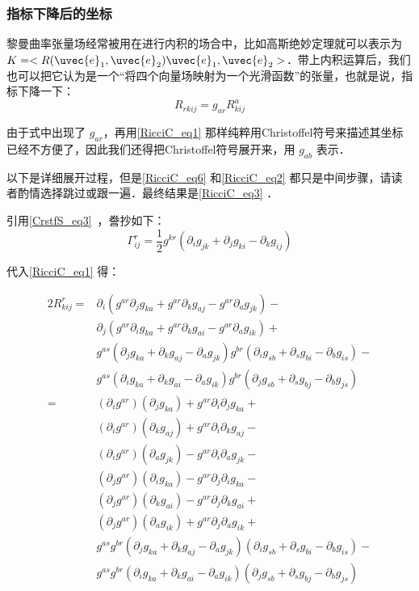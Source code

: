 \subsubsection{指标下降后的坐标}

黎曼曲率张量场经常被用在进行内积的场合中，比如高斯绝妙定理就可以表示为 $K=<R(\uvec{e}_1, \uvec{e}_2)\uvec{e}_1, \uvec{e}_2>$．带上内积运算后，我们也可以把它认为是一个“将四个向量场映射为一个光滑函数”的张量，也就是说，指标下降一下：
\begin{equation}
R_{rkij}=g_{ar}R^a_{kij}
\end{equation}

由于式中出现了 $g_{ar}$，再用\autoref{RicciC_eq1} 那样纯粹用Christoffel符号来描述其坐标已经不方便了，因此我们还得把Christoffel符号展开来，用 $g_{ab}$ 表示．

以下是详细展开过程，但是\autoref{RicciC_eq6} 和\autoref{RicciC_eq2} 都只是中间步骤，请读者酌情选择跳过或跟一遍．最终结果是\autoref{RicciC_eq3} ．

引用\autoref{CrstfS_eq3}~，誊抄如下：
\begin{equation}
\Gamma^{r}_{ij}=\frac{1}{2}g^{kr}(\partial_ig_{jk}+\partial_jg_{ki}-\partial_kg_{ij})
\end{equation}

代入\autoref{RicciC_eq1} 得：

\begin{equation}\label{RicciC_eq6}
\begin{aligned}
2R^r_{kij}={}&\partial_i(g^{ar}\partial_jg_{ka}+g^{ar}\partial_kg_{aj}-g^{ar}\partial_ag_{jk})-\\
&\partial_j(g^{ar}\partial_ig_{ka}+g^{ar}\partial_kg_{ai}-g^{ar}\partial_ag_{ik})+\\
&g^{as}(\partial_jg_{ka}+\partial_kg_{aj}-\partial_ag_{jk})g^{br}(\partial_ig_{sb}+\partial_sg_{bi}-\partial_bg_{is})-\\
&g^{as}(\partial_ig_{ka}+\partial_kg_{ai}-\partial_ag_{ik})g^{br}(\partial_jg_{sb}+\partial_sg_{bj}-\partial_bg_{js})\\
={}&(\partial_ig^{ar})(\partial_jg_{ka})+g^{ar}\partial_i\partial_jg_{ka}+\\
&(\partial_ig^{ar})(\partial_kg_{aj})+g^{ar}\partial_i\partial_kg_{aj}-\\
&(\partial_ig^{ar})(\partial_ag_{jk})-g^{ar}\partial_i\partial_ag_{jk}-\\%
&(\partial_jg^{ar})(\partial_ig_{ka})-g^{ar}\partial_j\partial_ig_{ka}-\\
&(\partial_jg^{ar})(\partial_kg_{ai})-g^{ar}\partial_j\partial_kg_{ai}+\\
&(\partial_jg^{ar})(\partial_ag_{ik})+g^{ar}\partial_j\partial_ag_{ik}+\\%
&g^{as}g^{br}(\partial_jg_{ka}+\partial_kg_{aj}-\partial_ag_{jk})(\partial_ig_{sb}+\partial_sg_{bi}-\partial_bg_{is})-\\
&g^{as}g^{br}(\partial_ig_{ka}+\partial_kg_{ai}-\partial_ag_{ik})(\partial_jg_{sb}+\partial_sg_{bj}-\partial_bg_{js})
\end{aligned}
\end{equation}

